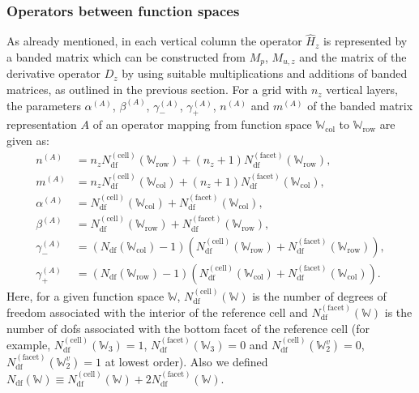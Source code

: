 \documentclass[10pt]{article}
\newcommand{\Wspace}{\mathbb{W}}
\begin{document}
\subsubsection{Operators between function spaces}
As already mentioned, in each vertical column the operator $\hat{H}_z$ is represented by a banded matrix which can be constructed from $M_p$, $M_{u,z}$ and the matrix of the derivative operator $D_z$
by using suitable multiplications and additions of banded matrices, as outlined in the previous section. 
For a grid with $n_z$ vertical layers, the parameters $\alpha^{(A)}$, $\beta^{(A)}$, $\gamma_-^{(A)}$, $\gamma_+^{(A)}$, $n^{(A)}$ and $m^{(A)}$ of the banded matrix representation $A$ of an operator mapping from function space $\Wspace_{\text{col}}$ to $\Wspace_{\text{row}}$ are given as:
\begin{equation}
  \begin{aligned}
  n^{(A)} &= n_zN_{\text{df}}^{(\text{cell})}(\Wspace_{\text{row}}) + (n_z+1)N_{\text{df}}^{(\text{facet})}(\Wspace_{\text{row}}),\\
  m^{(A)} &= n_zN_{\text{df}}^{(\text{cell})}(\Wspace_{\text{col}}) + (n_z+1)N_{\text{df}}^{(\text{facet})}(\Wspace_{\text{col}}),\\
  \alpha^{(A)} &= N_{\text{df}}^{(\text{cell})}(\Wspace_{\text{col}}) + N_{\text{df}}^{(\text{facet})}(\Wspace_{\text{col}}),\\
  \beta^{(A)} &= N_{\text{df}}^{(\text{cell})}(\Wspace_{\text{row}}) + N_{\text{df}}^{(\text{facet})}(\Wspace_{\text{row}}),\\
  \gamma_-^{(A)} &= (N_{\text{df}}(\Wspace_{\text{col}})-1)\left(N_{\text{df}}^{(\text{cell})}(\Wspace_{\text{row}}) + N_{\text{df}}^{(\text{facet})}(\Wspace_{\text{row}})\right),\\
  \gamma_+^{(A)} &= (N_{\text{df}}(\Wspace_{\text{row}})-1)\left(N_{\text{df}}^{(\text{cell})}(\Wspace_{\text{col}}) + N_{\text{df}}^{(\text{facet})}(\Wspace_{\text{col}})\right).
  \end{aligned}
\end{equation}
Here, for a given function space $\Wspace$, $N_{\text{df}}^{(\text{cell})}(\Wspace)$ is the number of degrees of freedom associated with the interior of the reference cell and $N_{\text{df}}^{(\text{facet})}(\Wspace)$ is the number of dofs associated with the bottom facet of the reference cell (for example, $N_{\text{df}}^{(\text{cell})}(\Wspace_3)=1$, $N_{\text{df}}^{(\text{facet})}(\Wspace_3)=0$ and $N_{\text{df}}^{(\text{cell})}(\Wspace_2^v)=0$, $N_{\text{df}}^{(\text{facet})}(\Wspace_2^v)=1$ at lowest order). Also we defined $N_{\text{df}}(\Wspace)\equiv N_{\text{df}}^{(\text{cell})}(\Wspace)+2N_{\text{df}}^{(\text{facet})}(\Wspace)$.
\end{document}
